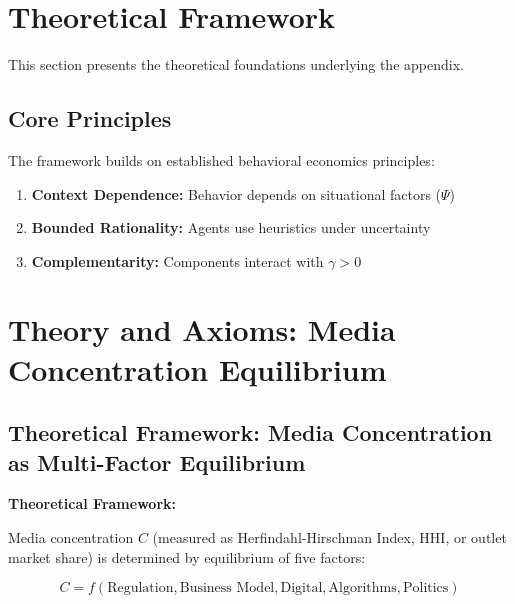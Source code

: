 

\section{Theoretical Framework}
\label{sec:bg-theory}

This section presents the theoretical foundations underlying the appendix.

\subsection{Core Principles}

The framework builds on established behavioral economics principles:

\begin{enumerate}
    \item \textbf{Context Dependence:} Behavior depends on situational factors ($\Psi$)
    \item \textbf{Bounded Rationality:} Agents use heuristics under uncertainty
    \item \textbf{Complementarity:} Components interact with $\gamma > 0$
\end{enumerate}

\section*{Theory and Axioms: Media Concentration Equilibrium}

\subsection*{Theoretical Framework: Media Concentration as Multi-Factor Equilibrium}

\textbf{Theoretical Framework:}

Media concentration $C$ (measured as Herfindahl-Hirschman Index, HHI, or outlet market share)
is determined by equilibrium of five factors:

\begin{equation}
C = f(\text{Regulation}, \text{Business Model}, \text{Digital}, \text{Algorithms}, \text{Politics})
\end{equation}

